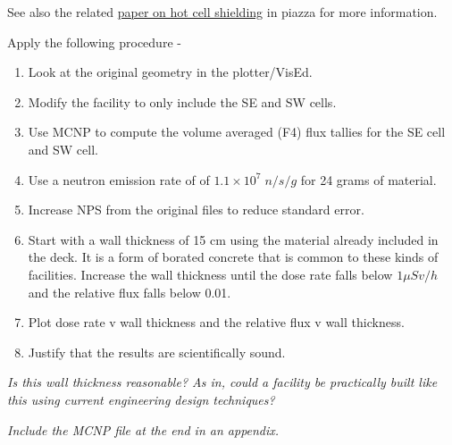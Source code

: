 \documentclass[11pt,a4paper]{article}
\begin{document}
\noindent See also the related \href{https://piazza.com/class_profile/get_resource/kr0va8w7fkb32r/kr0vaeh6ukh3ax}{paper on hot cell shielding} in piazza for more information. 

\vspace{\baselineskip}

\noindent Apply the following procedure - 
\begin{enumerate}[leftmargin=*,topsep=0pt,label=\alph*.]
    \item Look at the original geometry in the plotter/VisEd.
    \item Modify the facility to only include the SE and SW cells.
    \item Use MCNP to compute the volume averaged (F4) flux tallies for the SE cell and SW cell.
    \item Use a neutron emission rate of of $1.1 \times 10^7 \; n/s/g$ for 24 grams of material. 
    \item Increase NPS from the original files to reduce standard error.
    \item Start with a wall thickness of 15 cm using the material already included in the deck. It is a form of borated concrete that is common to these kinds of facilities. Increase the wall thickness until the dose rate falls below $1 \mu Sv/h$ and the relative flux falls below 0.01.
    \item Plot dose rate v wall thickness and the relative flux v wall thickness.
    \item Justify that the results are scientifically sound.
\end{enumerate}

\vspace{\baselineskip}

\noindent\textit{Is this wall thickness reasonable? As in, could a facility be practically built like this using current engineering design techniques?}

\vspace{\baselineskip}

\noindent\textit{Include the MCNP file at the end in an appendix.}





\newpage
\end{document}
